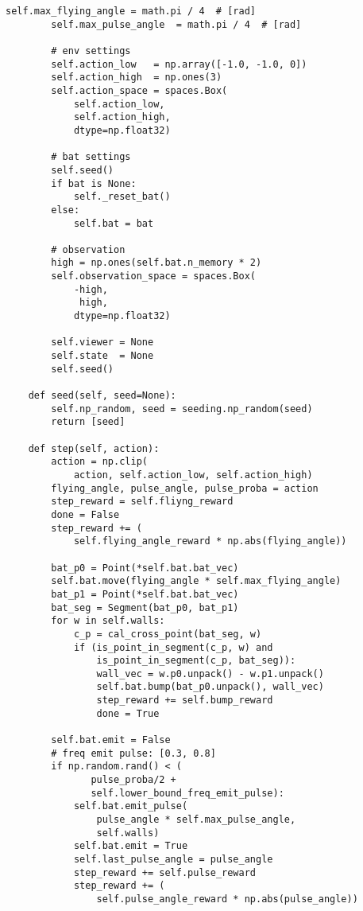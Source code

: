 \documentclass[../appendix]{subfiles}
\begin{document}
\begin{lstlisting}[frame=single]
        self.max_flying_angle = math.pi / 4  # [rad]
        self.max_pulse_angle  = math.pi / 4  # [rad]

        # env settings
        self.action_low   = np.array([-1.0, -1.0, 0])
        self.action_high  = np.ones(3)
        self.action_space = spaces.Box(
            self.action_low,
            self.action_high,
            dtype=np.float32)
        
        # bat settings
        self.seed()
        if bat is None:
            self._reset_bat()
        else:
            self.bat = bat

        # observation
        high = np.ones(self.bat.n_memory * 2)
        self.observation_space = spaces.Box(
            -high,
             high,
            dtype=np.float32)
        
        self.viewer = None
        self.state  = None
        self.seed()

    def seed(self, seed=None):
        self.np_random, seed = seeding.np_random(seed)
        return [seed]
   
    def step(self, action):
        action = np.clip(
            action, self.action_low, self.action_high)
        flying_angle, pulse_angle, pulse_proba = action
        step_reward = self.fliyng_reward
        done = False
        step_reward += (
            self.flying_angle_reward * np.abs(flying_angle))

        bat_p0 = Point(*self.bat.bat_vec)
        self.bat.move(flying_angle * self.max_flying_angle)
        bat_p1 = Point(*self.bat.bat_vec)
        bat_seg = Segment(bat_p0, bat_p1)
        for w in self.walls:
            c_p = cal_cross_point(bat_seg, w)
            if (is_point_in_segment(c_p, w) and 
                is_point_in_segment(c_p, bat_seg)):
                wall_vec = w.p0.unpack() - w.p1.unpack()
                self.bat.bump(bat_p0.unpack(), wall_vec)
                step_reward += self.bump_reward
                done = True

        self.bat.emit = False
        # freq emit pulse: [0.3, 0.8]
        if np.random.rand() < (
               pulse_proba/2 + 
               self.lower_bound_freq_emit_pulse):
            self.bat.emit_pulse(
                pulse_angle * self.max_pulse_angle, 
                self.walls)
            self.bat.emit = True
            self.last_pulse_angle = pulse_angle
            step_reward += self.pulse_reward
            step_reward += (
                self.pulse_angle_reward * np.abs(pulse_angle))


\end{lstlisting}
\end{document}
